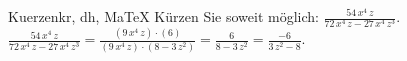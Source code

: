 \begin{MAufgabe}{Kuerzen}{kr, dh, MaTeX}
K\"urzen Sie soweit m\"oglich: $\frac{54\, x^4\, z}{72\, x^4\, z - 27\, x^4\, z^3}$.\\ 
\ifLsg\MLoesung
\quad $\frac{54\, x^4\, z}{72\, x^4\, z - 27\, x^4\, z^3}=\frac{(9\, x^4\, z)\cdot(6)}{(9\, x^4\, z)\cdot(8 - 3\, z^2)}=\frac{6}{8 - 3\, z^2}=\frac{-6}{3\, z^2 - 8}$.\else\relax\fi
 \end{MAufgabe}